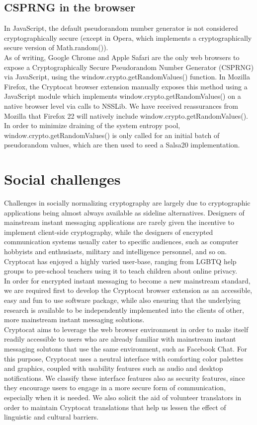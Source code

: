 \documentclass[letterpaper,twocolumn,10pt]{article}
\begin{document}
\subsection{CSPRNG in the browser}

In JavaScript, the default pseudorandom number generator is not considered cryptographically secure (except in Opera, which implements a cryptographically secure version of Math.random()). \\
As of writing, Google Chrome and Apple Safari are the only web browsers to expose a Cryptographically Secure Pseudorandom Number Generator (CSPRNG) via JavaScript, using the window.crypto.getRandomValues() \cite{webcrypto-spec} function. In Mozilla Firefox, the Cryptocat browser extension manually exposes this method using a JavaScript module which implements window.crypto.getRandomValues() on a native browser level via calls to NSSLib. We have received reassurances from Mozilla that Firefox 22 will natively include window.crypto.getRandomValues(). \\
In order to minimize draining of the system entropy pool, window.crypto.getRandomValues() is only called for an initial batch of pseudorandom values, which are then used to seed a Salsa20 \cite{salsa20} implementation.

\section{Social challenges}

Challenges in socially normalizing cryptography are largely due to cryptographic applications being almost always available as sideline alternatives. Designers of mainstream instant messaging applications are rarely given the incentive to implement client-side cryptography, while the designers of encrypted communication systems usually cater to specific audiences, such as computer hobbyists and enthusiasts, military and intelligence personnel, and so on. Cryptocat has enjoyed a highly varied user-base, ranging from LGBTQ help groups to pre-school teachers using it to teach children about online privacy. \\
In order for encrypted instant messaging to become a new mainstream standard, we are required first to develop the Cryptocat browser extension as an accessible, easy and fun to use software package, while also ensuring that the underlying research is available to be independently implemented into the clients of other, more mainstream instant messaging solutions. \\
Cryptocat aims to leverage the web browser environment in order to make itself readily accessible to users who are already familiar with mainstream instant messaging solutons that use the same environment, such as Facebook Chat. For this purpose, Cryptocat uses a neutral interface with comforting color palettes and graphics, coupled with usability features such as audio and desktop notifications. We classify these interface features also as security features, since they encourage users to engage in a more secure form of communication, especially when it is needed. We also solicit the aid of volunteer translators in order to maintain Cryptocat translations that help us lessen the effect of linguistic and cultural barriers.
\end{document}
